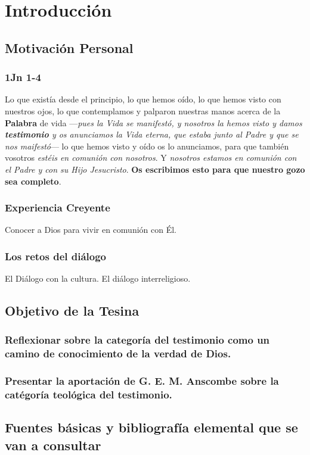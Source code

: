 \documentclass[12pt]{article}
\begin{document}
\section{Introducción}
\subsection{Motivación Personal}
\subsubsection{1Jn 1-4}
Lo que existía desde el principio, lo que hemos oído, lo que hemos visto con nuestros ojos, lo que contemplamos y palparon nuestras manos acerca de la \textbf{Palabra} de vida ---\emph{pues la Vida se manifestó, y nosotros la hemos visto y damos \textbf{testimonio} y os anunciamos la Vida eterna, que estaba junto al Padre y que se nos maifestó}--- lo que hemos visto y oído os lo anunciamos, para que también vosotros \emph{estéis en comunión con nosotros}. Y \emph{nosotros estamos en comunión con el Padre y con su Hijo Jesucristo}. \textbf{Os escribimos esto para que nuestro gozo sea completo}.

\subsubsection{Experiencia Creyente}
Conocer a Dios para vivir en comunión con Él. 

\subsubsection{Los retos del diálogo}
El Diálogo con la cultura. El diálogo interreligioso. 

\subsection{Objetivo de la Tesina}
\subsubsection{Reflexionar sobre la categoría del testimonio como un camino de conocimiento de la verdad de Dios.}
\subsubsection{Presentar la aportación de G. E. M. Anscombe sobre la catégoría teológica del testimonio.}

\subsection{Fuentes básicas y bibliografía elemental que se van a consultar}
\end{document}
